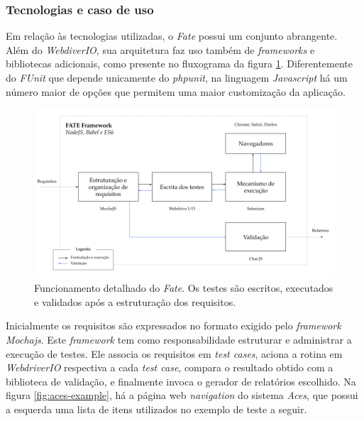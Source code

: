 \hypertarget{tecnologias-e-caso-de-uso}{%
\subsubsection{Tecnologias e caso de uso}\label{tecnologias-e-caso-de-uso}}

Em relação às tecnologias utilizadas, o \emph{Fate} possui um conjunto abrangente. Além do \emph{WebdiverIO}, sua arquitetura faz uso também de \emph{frameworks} e bibliotecas adicionais, como presente no fluxograma da figura \ref{fig:fate-framework}. Diferentemente do \emph{FUnit} que depende unicamente do \emph{phpunit}, na linguagem \emph{Javascript} há um número maior de opções que permitem uma maior customização da aplicação.

\begin{figure}[H]
    \centering
    \includegraphics[width=14.5cm]{source/4-solucao/images/fate-framework.png}
    \caption{Funcionamento detalhado do \emph{Fate}. Os testes são escritos, executados e validados após a estruturação dos requisitos.}
    \label{fig:fate-framework}
\end{figure}

Inicialmente os requisitos são expressados no formato exigido pelo \emph{framework Mochajs}. Este \emph{framework} tem como responsabilidade estruturar e administrar a execução de testes. Ele associa os requisitos em \emph{test cases}, aciona a rotina em \emph{WebdriverIO} respectiva a cada \emph{test case}, compara o resultado obtido com a biblioteca de validação, e finalmente invoca o gerador de relatórios escolhido. Na figura \ref{fig:aces-example}, há a página web \emph{navigation} do sistema \emph{Aces}, que possui a esquerda uma lista de itens utilizados no exemplo de teste a seguir.

